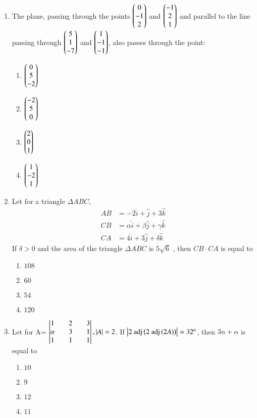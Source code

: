 \documentclass[journal]{IEEEtran}
\theoremstyle{remark}
\begin{document}
\begin{enumerate}
\item The plane, passing through the points $\begin{pmatrix}0\\ -1\\ 2\end{pmatrix}$ and $\begin{pmatrix}-1\\ 2\\ 1\end{pmatrix}$ and parallel to the line passing through $\begin{pmatrix}5\\1\\-7\end{pmatrix}$ and $\begin{pmatrix}1\\-1\\-1\end{pmatrix}$, also passes through the point:

\begin{multicols}{4}
\begin{enumerate}
\item $\begin{pmatrix}0\\5\\-2\end{pmatrix}$
\item $\begin{pmatrix}-2\\5\\0\end{pmatrix}$
\item $\begin{pmatrix}2\\0\\1\end{pmatrix}$
\item $\begin{pmatrix}1\\-2\\1\end{pmatrix}$
\end{enumerate}
\end{multicols}

\item Let for a triangle $\Delta ABC$,
\begin{align*}
AB &= -2\hat{i} +\hat{j} +3\hat{k} \\
CB &= \alpha \hat{i} +\beta \hat{j} +\gamma \hat{k}\\
CA &= 4\hat{i} +3\hat{j} +\delta \hat{k}
\end{align*}
If $\delta >0$ and the area of the triangle $\Delta ABC$ is $5\sqrt{6}$ , then $CB \cdot CA $ is equal to

\begin{multicols}{4}
\begin{enumerate}
\item $108$
\item $60$
\item $54$
\item $120$
\end{enumerate}
\end{multicols}

\item Let for A= $\begin{vmatrix} 1&&2&&3\\\alpha&&3 &&1\\1&&1&&1\end{vmatrix} , \left\vert A\right\vert=2$. If
$\left\vert2\text{ adj}\left(2\text{ adj}\left(2A\right)\right)\right\vert=32^n$, then $3n+\alpha$ is equal to
\begin{multicols}{4}
\begin{enumerate}
\item $10$
\item $9$
\item $12$
\item $11$
\end{enumerate}
\end{multicols}


\end{enumerate}
\end{document}
